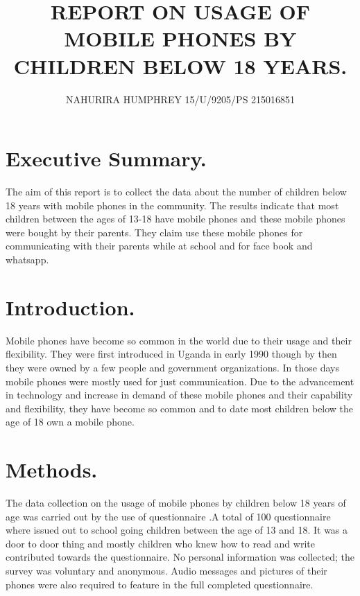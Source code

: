 \documentclass {article}
\begin{document}
\title {REPORT ON USAGE OF MOBILE PHONES BY CHILDREN BELOW 18 YEARS.}

\author  { NAHURIRA HUMPHREY     15/U/9205/PS      215016851}
\maketitle

\section{Executive Summary.}
The aim of this report is to collect the data about the number of children below 18 years with mobile phones in the community. The results indicate that most children between the ages of 13-18 have mobile phones and these mobile phones were bought by their parents. They claim use these mobile phones for communicating with their parents while at school and for face book and whatsapp.
\section{Introduction.}
Mobile phones have become so common in the world due to their usage and their flexibility. They were first introduced in Uganda in early 1990 though by then they were owned by a few people and government organizations. In those days mobile phones were mostly used for just communication.
Due to the advancement in technology and increase in demand of these mobile phones and their capability and flexibility, they have become so common and to date most children below the age of 18 own a mobile phone.
\section{Methods.}
The data collection on the usage of mobile phones by children below 18 years of age was carried out by the use of questionnaire .A total of 100 questionnaire where issued out to school going children between the age of 13 and 18. It was a door to door thing and mostly children who knew how to read and write contributed towards the questionnaire.  No personal information was collected; the survey was voluntary and anonymous.  Audio messages and pictures of their phones were also required to feature in the full completed questionnaire.
\end{document}
